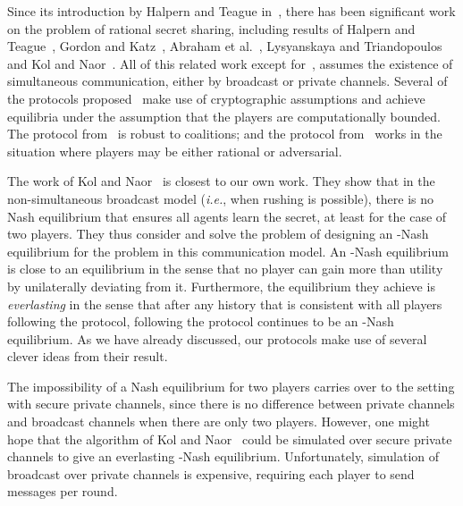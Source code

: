 \documentclass[12pt]{article}
\theoremstyle{definition}
\newcommand{\ie}{\emph{i.e.}}
\begin{document}
Since its introduction by Halpern and Teague
in~\cite{halpern2004rational}, there has been significant work on the
problem of rational secret sharing, including results of Halpern and
Teague~\cite{halpern2004rational}, Gordon and
Katz~\cite{gordon2006rational}, Abraham et
al.~\cite{abraham2006distributed}, Lysyanskaya and
Triandopoulos~\cite{lysyanskaya2006rationality} and Kol and
Naor~\cite{kol2008games}.  All of this related work except
for~\cite{kol2008games}, assumes the existence of simultaneous
communication, either by broadcast or private channels.  Several of
the protocols proposed~\cite{gordon2006rational,
  abraham2006distributed, lysyanskaya2006rationality} make use of
cryptographic assumptions and achieve equilibria under the assumption
that the players are computationally bounded.  The protocol
from~\cite{abraham2006distributed} is robust to coalitions; and the
protocol from~\cite{lysyanskaya2006rationality} works in the situation
where players may be either rational or adversarial.

The work of Kol and Naor~\cite{kol2008games} is closest to our own
work.  They show that in the non-simultaneous broadcast model (\ie,
when rushing is possible), there is no Nash equilibrium that ensures
all agents learn the secret, at least for the case of two
players. They thus consider and solve the problem of designing an
-Nash equilibrium for the problem in this communication
model.  An -Nash equilibrium is close to an equilibrium in
the sense that no player can gain more than  utility by
unilaterally deviating from it. Furthermore, the equilibrium they
achieve is \emph{everlasting} in the sense that after any history that
is consistent with all players following the protocol, following the
protocol continues to be an -Nash equilibrium.  As we have
already discussed, our protocols make use of several clever ideas from
their result.

The impossibility of a Nash equilibrium for two players carries over
to the setting with secure private channels, since there is no
difference between private channels and broadcast channels when there
are only two players. However, one might hope that the algorithm of
Kol and Naor~\cite{kol2008games} could be simulated over secure
private channels to give an everlasting -Nash
equilibrium. Unfortunately, simulation of broadcast over private
channels is expensive, requiring each player to send 
messages per round.
\end{document}
